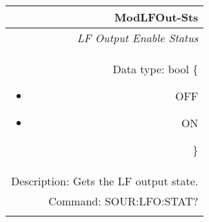 \documentclass[openany]{article}
\begin{document}
		\begin{tabular}{N}
			\hline
			\bfseries ModLFOut-Sts \\ \hline
			\emph{LF Output Enable Status} \\
			Data type: bool \{\begin{itemize}[noitemsep]
				\small
				\item[] OFF
				\item[] ON
			\end{itemize}\} \\
			Description: Gets the LF output state. \\
			Command: SOUR:LFO:STAT? \\
			\\
			
		\end{tabular}
\end{document}
